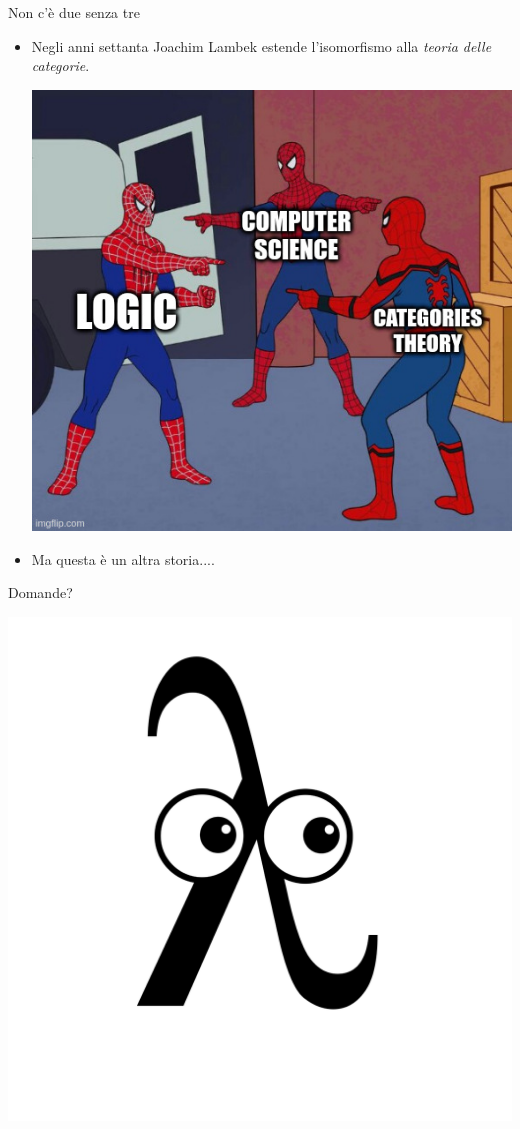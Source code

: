 \documentclass{beamer}
\begin{document}
\begin{frame}{Non c'è due senza tre}
\begin{itemize}
  \item  Negli anni settanta Joachim Lambek estende l'isomorfismo alla \textit{
      teoria delle categorie}.
\begin{center}
\includegraphics[scale=0.45]{11.jpg}
\end{center}
  \item Ma questa è un altra storia....
\end{itemize}

\end{frame}


\begin{frame}{Domande?}
\begin{center}
\includegraphics[scale=0.20]{12.png}
\end{center}
\end{frame}
\end{document}
